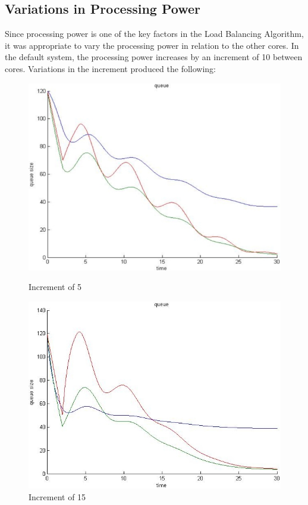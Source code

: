 \documentclass{article}
\begin{document}
\subsection{Variations in Processing Power }
Since processing power is one of the key factors in the Load Balancing Algorithm, it was appropriate to vary the processing power in relation to the other cores. In the default system, the processing power increases by an increment of 10 between cores. Variations in the increment produced the following:
\begin{figure}[ht]
\begin{center}
\begin{minipage}{0.45\linewidth}
\includegraphics[width=0.95\linewidth]{./PP_less_varied.jpg}
\caption{Increment of 5}\label{LvarP}
\end{minipage}
\begin{minipage}{0.45\linewidth}
\includegraphics[width=0.95\linewidth]{./PP_more_varied.jpg}
\caption{Increment of 15}\label{HvarP}
\end{minipage}
\end{center}
\end{figure}
\end{document}
